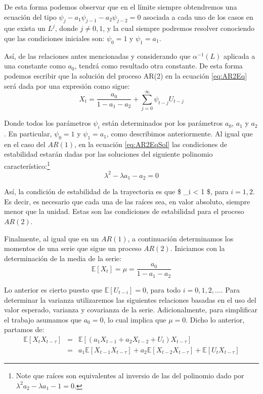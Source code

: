 \documentclass[
]{book}
\begin{document}
De esta forma podemos observar que en el límite siempre obtendremos una ecuación del tipo \(\psi_j - a_1 \psi_{j-1} - a_2 \psi_{j-2} = 0\) asociada a cada uno de los casos en que exista un \(L^j\), donde \(j \neq 0, 1\), y la cual siempre podremos resolver conociendo que las condiciones iniciales son: \(\psi_0 = 1\) y \(\psi_1 = a_1\).

Así, de las relaciones antes mencionadas y considerando que \(\alpha^{-1} (L)\) aplicada a una constante como \(a_0\), tendrá como resultado otra constante. De esta forma podemos escribir que la solución del proceso AR(2) en la ecuación \eqref{eq:AR2Eq} será dada por una expresión como sigue:
\begin{equation}
    X_t = \frac{a_0}{1 - a_1 - a_2} + \sum^{\infty}_{j = 0} \psi_{t - j} U_{t - j}
    \label{eq:AR2EqSol}
\end{equation}

Donde todos los parámetros \(\psi_i\) están determinados por los parámetros \(a_0\), \(a_1\) y \(a_2\). En particular, \(\psi_0 = 1\) y \(\psi_1 = a_1\), como describimos anteriormente. Al igual que en el caso del \(AR(1)\), en la ecuación \eqref{eq:AR2EqSol} las condiciones de estabilidad estarán dadas por las soluciones del siguiente polinomio característico:\footnote{Note que raíces son equivalentes al inversio de las del polinomio dado por $\lambda^2 a_2 - \lambda a_1 - 1 = 0$.}
\begin{equation}
    \lambda^2 - \lambda a_1 - a_2 = 0
\end{equation}

Así, la condición de estabilidad de la trayectoria es que \$ \textbar{} \lambda\_i \textbar{} \textless{} 1 \$, para \(i = 1, 2\). Es decir, es necesario que cada una de las raíces sea, en valor absoluto, siempre menor que la unidad. Estas son las condiciones de estabilidad para el proceso \(AR(2)\).

Finalmente, al igual que en un \(AR(1)\), a continuación determinamos los momentos de una serie que sigue un proceso \(AR(2)\). Iniciamos con la determinación de la media de la serie:
\begin{equation}
    \mathbb{E}[X_t] = \mu = \frac{a_0}{1 - a_1 - a_2}
\end{equation}

Lo anterior es cierto puesto que \(\mathbb{E}[U_{t - i}] = 0\), para todo \(i = 0, 1, 2, \ldots\). Para determinar la varianza utilizaremos las siguientes relaciones basadas en el uso del valor esperado, varianza y covarianza de la serie. Adicionalmente, para simplificar el trabajo asumamos que \(a_0 = 0\), lo cual implica que \(\mu = 0\). Dicho lo anterior, partamos de:
\begin{eqnarray*}
    \mathbb{E}[X_t X_{t - \tau}] & = & \mathbb{E}[(a_1 X_{t-1} + a_2 X_{t-2} + U_t) X_{t - \tau}]\\
    & = & a_1 \mathbb{E}[X_{t - 1} X_{t - \tau}] + a_2 \mathbb{E}[X_{t - 2} X_{t - \tau}] + \mathbb{E}[U_{t} X_{t - \tau}]
\end{eqnarray*}
\end{document}
